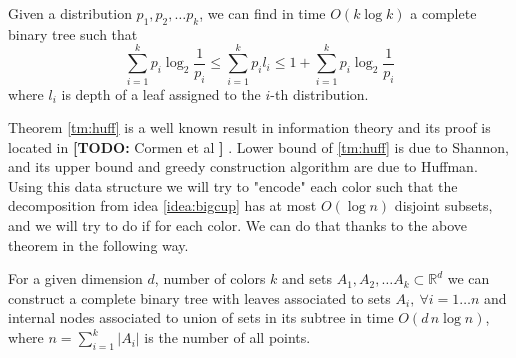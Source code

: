 \documentclass[a4paper,UKenglish,cleveref, autoref, thm-restate]{lipics-v2021}
\newcommand{\nota}[3]{{%
		\color{#2}
		\marginpar{\color{#2!75!black}\textbf\texttimes}%
		\textsf{\textbf{[\textbullet#1:}
			\textsf{\small#3}
			\textbf{\textbullet]}}%
}}
\newcommand{\todo}[1]{\nota{TODO}{red!55!black}{#1}}
\begin{document}
\begin{theorem}\label{tm:huff}
Given a distribution $p_1, p_2, \dots p_k$, we can find in time $O(k \log k)$ a complete binary tree such that
$$ \sum \limits_{i = 1}^k p_i \log_2 \frac{1}{p_i} \leq \sum \limits_{i = 1}^k p_i l_i \leq 1 + \sum \limits_{i = 1}^k p_i \log_2 \frac{1}{p_i} $$
where $l_i$ is depth of a leaf assigned to the $i$-th distribution.
\end{theorem}
Theorem \ref{tm:huff} is a well known result in information theory and its proof is located in \todo{Cormen et al}.
Lower bound of \ref{tm:huff} is due to Shannon, and its upper bound and greedy construction algorithm are due to Huffman.
Using this data structure we will try to "encode" each color such that the decomposition from idea \ref{idea:bigcup} has at most $O\left(\log n\right)$ disjoint subsets, and we will try to do if for each color.
We can do that thanks to the above theorem in the following way.
\begin{theorem}\label{tm:logn}
For a given dimension $d$, number of colors $k$ and sets $A_1, A_2, \dots A_k \subset \mathbb{R}^d$ we can construct a complete binary tree with leaves associated to sets
$A_i,\ \forall i = 1 \dots n$ and internal nodes associated to union of sets in its subtree in time $O\left(d\, n \log n\right)$, where $n = \sum \limits_{i = 1}^k |A_i|$ is the number of all points.
\end{theorem}
\end{document}
